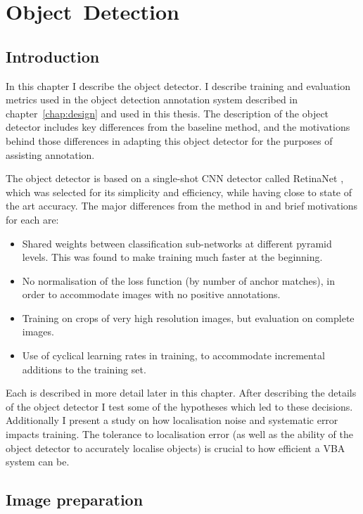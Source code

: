 \chapter{Object~Detection}
\label{chap:object_detection} 

\section{Introduction}

In this chapter I describe the object detector. I describe training and evaluation metrics used in the object detection annotation system described in chapter~\ref{chap:design} and used in this thesis.  The description of the object detector includes key differences from the baseline method, and the motivations behind those differences in adapting this object detector for the purposes of assisting annotation.

The object detector is based on a single-shot \gls{CNN} detector called RetinaNet \cite{Lin2017}, which was selected for its simplicity and efficiency, while having close to state of the art accuracy. The major differences from the method in \cite{Lin2017} and brief motivations for each are:

\begin{itemize}
    \item Shared weights between classification sub-networks at different pyramid levels. This was found to make training much faster at the beginning.
    \item No normalisation of the loss function (by number of anchor matches), in order to accommodate images with no positive annotations.
    \item Training on crops of very high resolution images, but evaluation on complete images.
    \item Use of cyclical learning rates in training, to accommodate incremental additions to the training set.
\end{itemize}

Each is described in more detail later in this chapter. After describing the details of the object detector I test some of the hypotheses which led to these decisions. Additionally I present a study on how localisation noise and systematic error impacts training. The tolerance to localisation error (as well as the ability of the object detector to accurately localise objects) is crucial to how efficient a \gls{VBA} system can be.

\section {Image preparation}

